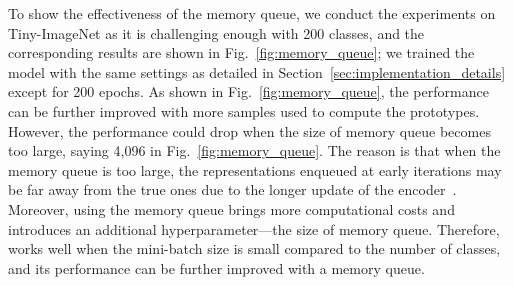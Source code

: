 To show the effectiveness of the memory queue, we conduct the experiments on Tiny-ImageNet as it is challenging enough with 200 classes, and the corresponding results are shown in Fig.~\ref{fig:memory_queue}; we trained the model with the same settings as detailed in Section~\ref{sec:implementation_details} except for 200 epochs.
As shown in Fig.~\ref{fig:memory_queue}, the performance can be further improved with more samples used to compute the prototypes.
However, the performance could drop when the size of memory queue becomes too large, saying 4,096 in Fig.~\ref{fig:memory_queue}. The reason is that when the memory queue is too large, the representations enqueued at early iterations may be far away from the true ones due to the longer update of the encoder~\cite{he2020momentum}.
Moreover, using the memory queue brings more computational costs and introduces an additional hyperparameter---the size of memory queue.
Therefore, \methodname works well when the mini-batch size is small compared to the number of classes, and its performance can be further improved with a memory queue.